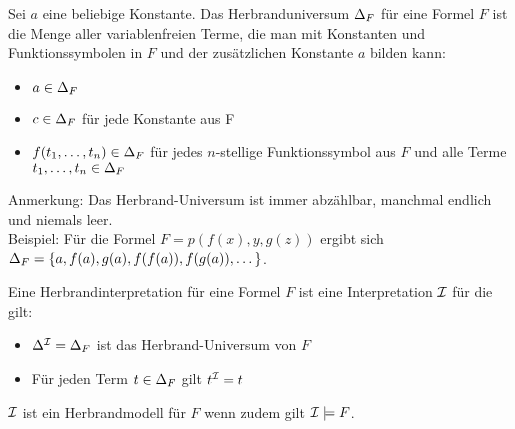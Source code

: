 \begin{description}
            Sei $a$ eine beliebige Konstante. Das Herbranduniversum $\Delta_{F}$ für eine Formel $F$ ist die Menge aller variablenfreien Terme, die man mit Konstanten und Funktionssymbolen in $F$ und der zusätzlichen Konstante $a$ bilden kann:
            \begin{itemize}
                \item $a \in \Delta_{F}$
                \item $c \in \Delta_{F}$ für jede Konstante aus F
                \item $f(t_{1}, \dots, t_{n}) \in \Delta_{F}$ für jedes $n$-stellige Funktionssymbol aus $F$ und alle Terme $t_{1}, \dots, t_{n} \in \Delta_{F}$
            \end{itemize}
            Anmerkung: Das Herbrand-Universum ist immer abzählbar, manchmal endlich und niemals leer. \\
            Beispiel: Für die Formel $F = p(f(x), y, g(z))$ ergibt sich $\Delta_{F} = \{a, f(a), g(a), f(f(a)), f(g(a)), \dots \}$.

            Eine Herbrandinterpretation für eine Formel $F$ ist eine Interpretation $\mathcal{I}$ für die gilt:
            \begin{itemize}
                \item $\Delta^{\mathcal{I}} = \Delta_{F}$ ist das Herbrand-Universum von $F$
                \item Für jeden Term $t \in \Delta_{F}$ gilt $t^{\mathcal{I}} = t$
            \end{itemize}
            $\mathcal{I}$ ist ein Herbrandmodell für $F$ wenn zudem gilt $\mathcal{I} \models F$.


    \end{description}
